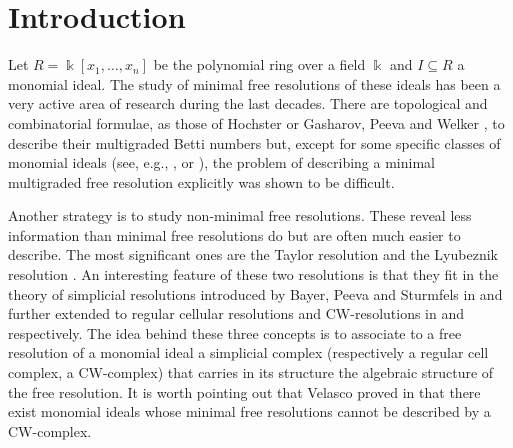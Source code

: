 \documentclass[12pt]{amsart}
\theoremstyle{definition}
\theoremstyle{remark}
\numberwithin{equation}{section}
\newcommand\kk{\Bbbk}
\newcommand{\phil}[1]{{\color{red} \sf $\star\star$ Philippe: [#1]}}
\newcommand{\josep}[1]{{\color{blue} \sf $\star\star$ Josep: [#1]}}
\begin{document}
\maketitle

\section{Introduction}

Let $R=\kk[x_1,\dots,x_n]$ be the polynomial ring over a field $\kk$ and $I\subseteq R$ a monomial ideal.
The study of minimal free resolutions of these ideals has been a very active area of research
during the last decades. There are topological and combinatorial formulae, as those of Hochster \cite{Hoc}
or Gasharov, Peeva and Welker \cite{GPW}, to describe their multigraded Betti numbers but, except for some
specific classes  of monomial ideals (see, e.g., \cite{EK}, \cite{Jac04} or \cite{FG}), the problem of describing a minimal
multigraded free resolution explicitly was shown to be difficult.

\vskip 2mm

Another strategy is to study non-minimal free resolutions.
These reveal less information than minimal free resolutions do but are
often much easier to describe. The most significant ones are  the Taylor resolution \cite{Tay66} and
the Lyubeznik resolution \cite{Lyu88}. An interesting feature of these two
resolutions is that they fit in the theory of simplicial resolutions
introduced by Bayer, Peeva and Sturmfels in \cite{BPS} and further extended
to regular cellular resolutions and CW-resolutions in \cite{BS} and \cite{JW} respectively. The idea behind
these three concepts is to associate to a free resolution of a monomial ideal a
simplicial complex (respectively a regular cell complex, a CW-complex) that carries in
its structure the algebraic structure of the free resolution. It is worth pointing
out that Velasco proved in \cite{Vel} that there exist monomial
ideals whose minimal free resolutions cannot be described by a CW-complex.

\vskip 2mm
\end{document}
